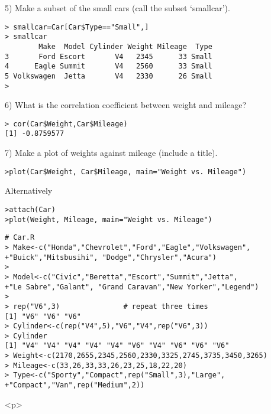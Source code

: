 5) Make a subset of the small cars (call the subset `smallcar').
\begin{verbatim}
> smallcar=Car[Car$Type=="Small",]
> smallcar
        Make  Model Cylinder Weight Mileage  Type
3       Ford Escort       V4   2345      33 Small
4      Eagle Summit       V4   2560      33 Small
5 Volkswagen  Jetta       V4   2330      26 Small
>
\end{verbatim}

6) What is the correlation coefficient between weight and mileage?

\begin{verbatim}
> cor(Car$Weight,Car$Mileage)
[1] -0.8759577
\end{verbatim}

7) Make a plot of weights against mileage (include a title).

\begin{verbatim}
>plot(Car$Weight, Car$Mileage, main="Weight vs. Mileage")
\end{verbatim}

Alternatively
\begin{verbatim}
>attach(Car)
>plot(Weight, Mileage, main="Weight vs. Mileage")
\end{verbatim}






\begin{verbatim}
# Car.R
> Make<-c("Honda","Chevrolet","Ford","Eagle","Volkswagen",
+"Buick","Mitsbusihi", "Dodge","Chrysler","Acura")
>
> Model<-c("Civic","Beretta","Escort","Summit","Jetta",
+"Le Sabre","Galant", "Grand Caravan","New Yorker","Legend")
>
> rep("V6",3)               # repeat three times
[1] "V6" "V6" "V6"
> Cylinder<-c(rep("V4",5),"V6","V4",rep("V6",3))
> Cylinder
[1] "V4" "V4" "V4" "V4" "V4" "V6" "V4" "V6" "V6" "V6"
> Weight<-c(2170,2655,2345,2560,2330,3325,2745,3735,3450,3265)
> Mileage<-c(33,26,33,33,26,23,25,18,22,20)
> Type<-c("Sporty","Compact",rep("Small",3),"Large",
+"Compact","Van",rep("Medium",2))
\end{verbatim}

<p>
